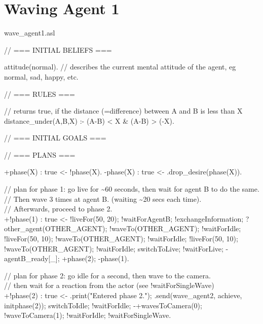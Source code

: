 \documentclass[draft,final]{vutinfth} %
\begin{document}
\section{Waving Agent 1}
{\ttfamily\scriptsize\raggedright
wave\_agent1.asl

// === INITIAL BELIEFS ===

attitude(normal).                   // describes the current mental attitude of the agent, eg normal, sad, happy, etc.

// === RULES ===

// returns true, if the distance (=difference) between A and B is less than X\\
distance\_under(A,B,X)
    :- (A-B) < X \& (A-B) > (-X).

// === INITIAL GOALS ===

// === PLANS ===

+phase(X) : true <- !phase(X).
-phase(X) : true <- .drop\_desire(phase(X)).

// plan for phase 1: go live for \~{}60 seconds, then wait for agent B to do the same.\\
// Then wave 3 times at agent B. (waiting \~{}20 secs each time).\\
// Afterwards, proceed to phase 2.\\
+!phase(1) : true
                    <-  !liveFor(50, 20);     
                        !waitForAgentB;
                        !exchangeInformation;
                        ?other\_agent(OTHER\_AGENT);
                        !waveTo(OTHER\_AGENT);
                        !waitForIdle;
                        !liveFor(50, 10);     
                        !waveTo(OTHER\_AGENT);
                        !waitForIdle;
                        !liveFor(50, 10);     
                        !waveTo(OTHER\_AGENT);
                        !waitForIdle;
                        switchToLive;
                        !waitForLive;
                        -agentB\_ready[\_];
                        +phase(2);
                        -phase(1).

// plan for phase 2: go idle for a second, then wave to the camera.\\
// then wait for a reaction from the actor (see !waitForSingleWave)\\
+!phase(2) : true
                    <-  .print("Entered phase 2.");
                        .send(wave\_agent2, achieve, initphase(2));
                        switchToIdle;
                        !waitForIdle;
                        -+wavesToCamera(0);
                        !waveToCamera(1);
                        !waitForIdle;
                        !waitForSingleWave.

}
\end{document}
